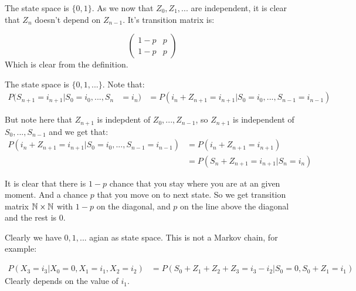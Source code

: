 
\beginproof
The state space is $\{0,1\}$. As we now that $Z_0,Z_1,...$ are independent, it is clear that $Z_n$ doesn't depend on $Z_{n-1}$. It's transition matrix is:

\[\begin{pmatrix}
1-p & p\\ 
1-p & p
\end{pmatrix}\]
Which is clear from the definition.\endproof


\beginproof
The state space is $\{0,1,...\}$.
Note that:
\begin{align*}
P(S_{n+1} = i_{n+1} | S_0 = i_0,...,S_{n} &=i_{n}) &= P(i_n+Z_{n+1}=i_{n+1} | S_0 = i_0,...,S_{n-1}=i_{n-1} )
\end{align*}

But note here that $Z_{n+1}$ is indepdent of $Z_0,...,Z_{n-1}$, so $Z_{n+1}$ is independent of $S_0,...,S_{n-1}$ and we get that:
\begin{align*}
P(i_n+Z_{n+1}=i_{n+1} | S_0 = i_0,...,S_{n-1}=i_{n-1} ) &= P(i_n+Z_{n+1}=i_{n+1})\\
&=  P(S_n+Z_{n+1}=i_{n+1} |S_n = i_n) 
\end{align*}

It is clear that there is $1-p$ chance that you stay where you are at an given moment. And a chance $p$ that you move on to next state. So we get transition matrix $\Bbb N \times \Bbb N$ with $1-p$ on the diagonal, and $p$ on the line above the diagonal and the rest is $0$.
\endproof


\beginproof
Clearly we have $0,1,...$ agian as state space. This is not a Markov chain, for example:

\begin{align*}
P(X_3= i_3 | X_0 = 0, X_1 = i_1, X_2 = i_2) &= P(S_0 + Z_1 + Z_2 + Z_3  =i_3 -i_2 | S_0 =0, S_0 +Z_1 = i_1) 
\end{align*}
Clearly depends on the value of $i_1$. 

\endproof